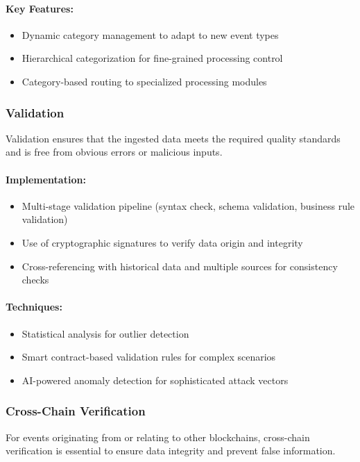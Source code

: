 \documentclass[12pt,a4paper]{article}
\begin{document}
	\paragraph{Key Features:}
	\begin{itemize}
		\item Dynamic category management to adapt to new event types
		\item Hierarchical categorization for fine-grained processing control
		\item Category-based routing to specialized processing modules
	\end{itemize}
	
	\subsubsection{Validation}
	Validation ensures that the ingested data meets the required quality standards and is free from obvious errors or malicious inputs.
	
	\paragraph{Implementation:}
	\begin{itemize}
		\item Multi-stage validation pipeline (syntax check, schema validation, business rule validation)
		\item Use of cryptographic signatures to verify data origin and integrity
		\item Cross-referencing with historical data and multiple sources for consistency checks
	\end{itemize}
	
	\paragraph{Techniques:}
	\begin{itemize}
		\item Statistical analysis for outlier detection
		\item Smart contract-based validation rules for complex scenarios
		\item AI-powered anomaly detection for sophisticated attack vectors
	\end{itemize}
	
	\subsubsection{Cross-Chain Verification}
	For events originating from or relating to other blockchains, cross-chain verification is essential to ensure data integrity and prevent false information.
	
\end{document}
